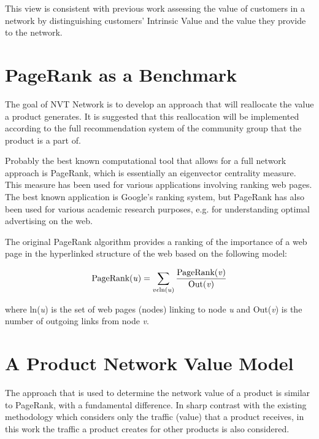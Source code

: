 This view is consistent with previous work assessing the value of customers in a network by distinguishing customers’ Intrinsic Value and the value they provide to the network.


\section{PageRank as a Benchmark}

The goal of NVT Network is to develop an approach that will reallocate the value a product generates. It is suggested that this reallocation will be implemented according to the full recommendation system of the community group that the product is a part of.

Probably the best known computational tool that allows for a full network approach is PageRank, which is essentially an eigenvector centrality measure. This measure has been used for various applications involving ranking web pages. The best known application is Google’s ranking system, but PageRank has also been used for various academic research purposes, e.g. for understanding optimal advertising on the web.

The original PageRank algorithm provides a ranking of the importance of a web page in the hyperlinked structure of the web based on the following model:

\begin{equation}
\textrm{PageRank(\textit{u})} = \sum_{v \epsilon \textrm{ln(\textit{u})}} \frac{\textrm{PageRank(\textit{v})}}{\textrm{Out(\textit{v})}}
\end{equation}

where ln(\textit{u}) is the set of web pages (nodes) linking to node \textit{u} and Out(\textit{v}) is the number of outgoing links from node \textit{v}.


\section{A Product Network Value Model}

The approach that is used to determine the network value of a product is similar to PageRank, with a fundamental difference. In sharp contrast with the existing methodology which considers only the traffic (value) that a product receives, in this work the traffic a product creates for other products is also considered.

